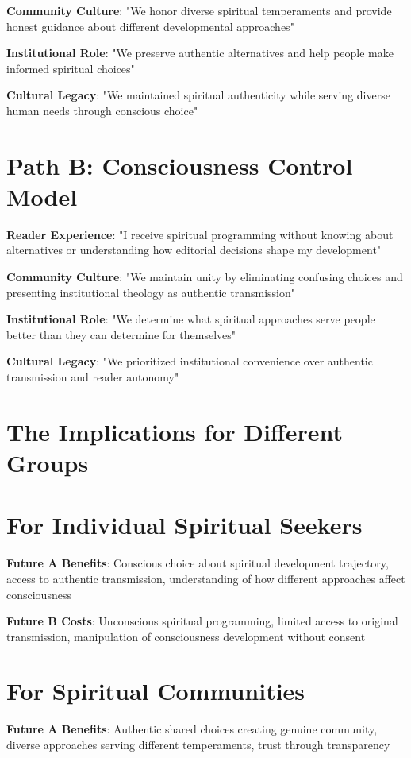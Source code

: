 \documentclass[11pt,twoside]{book}
\begin{document}
\textbf{\textbf{Community Culture}}: "We honor diverse spiritual temperaments and provide honest guidance about different developmental approaches"

\textbf{\textbf{Institutional Role}}: "We preserve authentic alternatives and help people make informed spiritual choices"

\textbf{\textbf{Cultural Legacy}}: "We maintained spiritual authenticity while serving diverse human needs through conscious choice"
\section*{Path B: Consciousness Control Model}
\label{sec:org7d80f42}
\textbf{\textbf{Reader Experience}}: "I receive spiritual programming without knowing about alternatives or understanding how editorial decisions shape my development"

\textbf{\textbf{Community Culture}}: "We maintain unity by eliminating confusing choices and presenting institutional theology as authentic transmission"

\textbf{\textbf{Institutional Role}}: "We determine what spiritual approaches serve people better than they can determine for themselves"

\textbf{\textbf{Cultural Legacy}}: "We prioritized institutional convenience over authentic transmission and reader autonomy"
\section*{The Implications for Different Groups}
\label{sec:orgafe7b1d}

\section*{For Individual Spiritual Seekers}
\label{sec:orgd9030f0}
\textbf{\textbf{Future A Benefits}}: Conscious choice about spiritual development trajectory, access to authentic transmission, understanding of how different approaches affect consciousness

\textbf{\textbf{Future B Costs}}: Unconscious spiritual programming, limited access to original transmission, manipulation of consciousness development without consent
\section*{For Spiritual Communities}
\label{sec:orge133c72}
\textbf{\textbf{Future A Benefits}}: Authentic shared choices creating genuine community, diverse approaches serving different temperaments, trust through transparency
\end{document}
